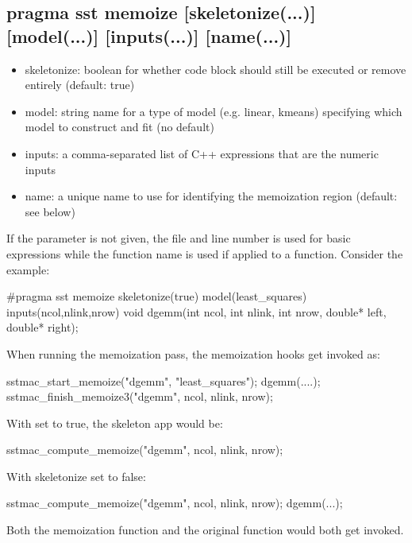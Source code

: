 \begin{CppCode}
struct least_squares : public regression model {
 FactoryRegister("least_squares", operating_system::regression_model, least_squares)
\end{CppCode}

\subsection{pragma sst memoize [skeletonize(...)] [model(...)] [inputs(...)] [name(...)]}
\begin{itemize}
\item skeletonize: boolean for whether code block should still be executed or remove entirely (default: true)
\item model: string name for a type of model (e.g. linear, kmeans) specifying which model to construct and fit (no default)
\item inputs: a comma-separated list of C++ expressions that are the numeric inputs
\item name: a unique name to use for identifying the memoization region (default: see below)
\end{itemize}
If the  parameter is not given, the file and line number is used for basic expressions while the function name is used if applied to a function.
Consider the example:

\begin{CppCode}
#pragma sst memoize skeletonize(true) model(least_squares) inputs(ncol,nlink,nrow) 
void dgemm(int ncol, int nlink, int nrow, double* left, double* right);
\end{CppCode}
When running the memoization pass, the memoization hooks get invoked as:

\begin{CppCode}
sstmac_start_memoize("dgemm", "least_squares");
dgemm(....);
sstmac_finish_memoize3("dgemm", ncol, nlink, nrow);
\end{CppCode}
With  set to true, the skeleton app would be:

\begin{CppCode}
sstmac_compute_memoize("dgemm", ncol, nlink, nrow);
\end{CppCode}
With skeletonize set to false:

\begin{CppCode}
sstmac_compute_memoize("dgemm", ncol, nlink, nrow);
dgemm(...);
\end{CppCode}
Both the memoization function and the original function would both get invoked.

